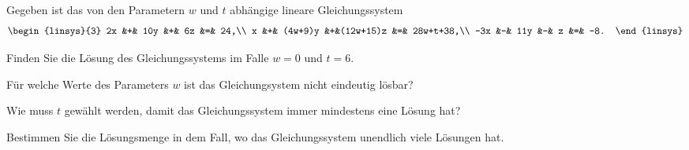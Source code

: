 Gegeben ist das von den Parametern $w$ und $t$ abhängige lineare
Gleichungssystem
\[
\begin{linsys}{3}
 2x &+&      10y &+&  6z      &=&       24,\\
  x &+&  (4w+9)y &+&(12w+15)z &=& 28w+t+38,\\
-3x &-&      11y &-&   z      &=&       -8.
\end{linsys}
\]
\begin{teilaufgaben}
\item
Finden Sie die Lösung des Gleichungssystems im Falle $w=0$ und $t=6$.
\item
Für welche Werte des Parameters $w$ ist das Gleichungsystem nicht eindeutig
lösbar?
\item
Wie muss $t$ gewählt werden, damit das Gleichungssystem immer mindestens
eine Lösung hat?
\item
Bestimmen Sie die Lösungsmenge in dem Fall, wo das Gleichungssystem unendlich
viele Lösungen hat.
\end{teilaufgaben}


